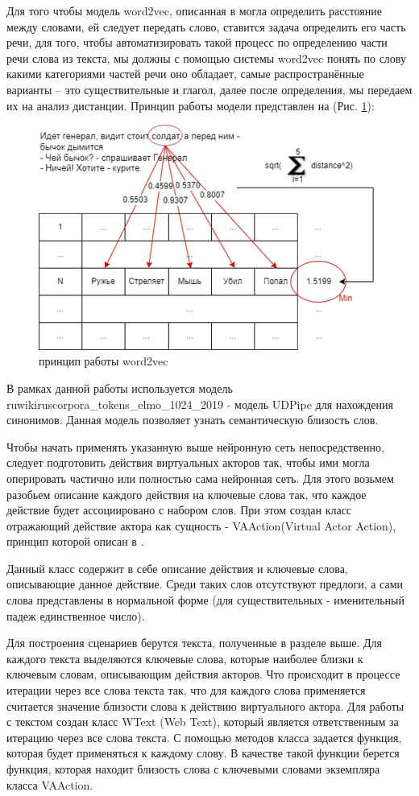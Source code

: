 Для того чтобы модель word2vec, описанная в \cite{w2vec02} могла определить расстояние между словами, ей следует передать слово, ставится задача определить 
его часть речи, для того, чтобы автоматизировать такой процесс по определению части речи слова из текста, мы должны с помощью 
системы word2vec понять по слову какими категориями частей речи оно обладает, самые распространённые варианты – это 
существительные и глагол, далее после определения,  мы передаем их на анализ дистанции. 
Принцип работы модели представлен на (Рис. \ref{pic:ris15}):

\begin{figure}[H]
\includegraphics[width=0.75\columnwidth]{./img/ris15.png}
\centering
\caption{принцип работы word2vec}
\label{pic:ris15}
\end{figure}

В рамках данной работы используется модель ruwikiruscorpora\_tokens\_elmo\_1024\_2019 - модель UDPipe для нахождения синонимов. 
Данная модель позволяет узнать семантическую близость слов.

Чтобы начать применять указанную выше нейронную сеть непосредственно, следует подготовить действия виртуальных акторов так, 
чтобы ими могла оперировать частично или полностью сама нейронная сеть. Для этого возьмем разобьем описание каждого действия 
на ключевые слова так, что каждое действие будет ассоциировано с набором слов. При этом создан класс отражающий действие 
актора как сущность - VAAction(Virtual Actor Action), принцип которой описан в \cite{w2vec01}.

Данный класс содержит в себе описание действия и ключевые слова, описывающие данное действие. 
Среди таких слов отсутствуют предлоги, а сами слова представлены в нормальной форме 
(для существительных - именительный падеж единственное число).

Для построения сценариев берутся текста, полученные в разделе выше. Для каждого текста выделяются ключевые слова, 
которые наиболее близки к ключевым словам, описывающим действия акторов. Что происходит в процессе итерации через 
все слова текста так, что для каждого слова применяется считается значение близости слова к действию виртуального 
актора. Для работы с текстом создан класс WText (Web Text), который является ответственным за итерацию через все 
слова текста. С помощью методов класса задается функция, которая будет применяться к каждому слову. В качестве 
такой функции берется функция, которая находит близость слова с ключевыми словами экземпляра класса VAAction.

